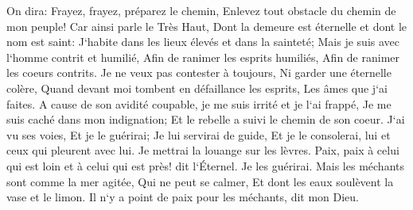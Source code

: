 \verse On dira: Frayez, frayez, préparez le chemin, Enlevez tout obstacle du chemin de mon peuple! 
\verse Car ainsi parle le Très Haut, Dont la demeure est éternelle et dont le nom est saint: J`habite dans les lieux élevés et dans la sainteté; Mais je suis avec l`homme contrit et humilié, Afin de ranimer les esprits humiliés, Afin de ranimer les coeurs contrits. 
\verse Je ne veux pas contester à toujours, Ni garder une éternelle colère, Quand devant moi tombent en défaillance les esprits, Les âmes que j`ai faites. 
\verse A cause de son avidité coupable, je me suis irrité et je l`ai frappé, Je me suis caché dans mon indignation; Et le rebelle a suivi le chemin de son coeur. 
\verse J`ai vu ses voies, Et je le guérirai; Je lui servirai de guide, Et je le consolerai, lui et ceux qui pleurent avec lui. 
\verse Je mettrai la louange sur les lèvres. Paix, paix à celui qui est loin et à celui qui est près! dit l`Éternel. Je les guérirai. 
\verse Mais les méchants sont comme la mer agitée, Qui ne peut se calmer, Et dont les eaux soulèvent la vase et le limon. 
\verse Il n`y a point de paix pour les méchants, dit mon Dieu. 

